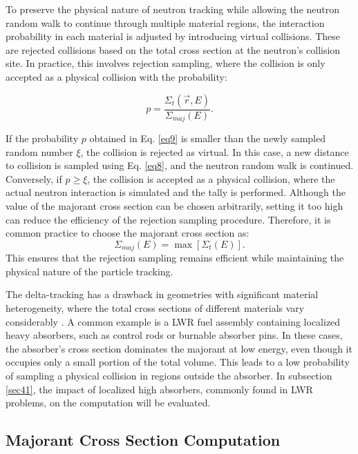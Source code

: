 To preserve the physical nature of neutron tracking while allowing the neutron random walk to continue through multiple material regions, the interaction probability in each material is adjusted by introducing virtual collisions. These are rejected collisions based on the total cross section at the neutron's collision site. In practice, this involves rejection sampling, where the collision is only accepted as a physical collision with the probability:

\begin{equation}
    p = \frac{\Sigma_t(\vec{r},E)}{\Sigma_{maj}(E)}.
    \label{eq9}
\end{equation}

If the probability $p$ obtained in Eq. \ref{eq9} is smaller than the newly sampled random number $\xi$, the collision is rejected as virtual. In this case, a new distance to collision is sampled using Eq. \ref{eq8}, and the neutron random walk is continued. Conversely, if $p \geq \xi$, the collision is accepted as a physical collision, where the actual neutron interaction is simulated and the tally is performed. Although the value of the majorant cross section can be chosen arbitrarily, setting it too high can reduce the efficiency of the rejection sampling procedure. Therefore, it is common practice to choose the majorant cross section as:
\begin{equation}
    \Sigma_{maj}(E) = \max{\left[\Sigma_t(E)\right]}.
    \label{eq10}
\end{equation}
This ensures that the rejection sampling remains efficient while maintaining the physical nature of the particle tracking.

The delta-tracking has a drawback in geometries with significant material heterogeneity, where the total cross sections of different materials vary considerably \cite{leppanen_2010}. A common example is a LWR fuel assembly containing localized heavy absorbers, such as control rods or burnable absorber pins. In these cases, the absorber's cross section dominates the majorant at low energy, even though it occupies only a small portion of the total volume. This leads to a low probability of sampling a physical collision in regions outside the absorber. In subsection \ref{sec41}, the impact of localized high absorbers, commonly found in LWR problems, on the computation will be evaluated.

\subsection{Majorant Cross Section Computation} \label{sec24}

